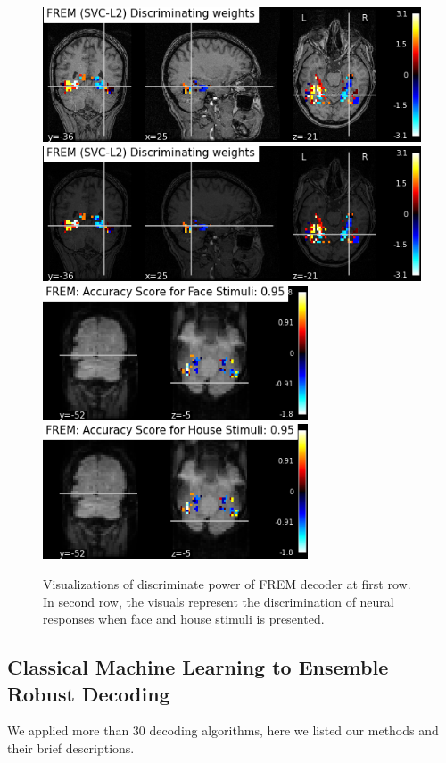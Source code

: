 \documentclass[10pt, twocolumn, letterpaper]{article}
\begin{document}
\begin{figure}
     \includegraphics[width=.5\linewidth, height=4cm,  valign=c]{images/FREM (SVC-L2) Discriminating weights anat.png}
    \includegraphics[width=.5\linewidth, height=4cm,  valign=c]{images/FREM (SVC-L2) Discriminating weights.png}
    \\[\smallskipamount]
    \includegraphics[width=.5\linewidth, height=4cm,  valign=c]{images/FREM_face.png}
    \includegraphics[width=.5\linewidth, height=4cm,  valign=c]{images/FREM_house.png}
    \caption{Visualizations of discriminate power of FREM decoder at first row. In second row, the visuals represent the discrimination of neural responses when face and house stimuli is presented.}\label{fig:frem}
\end{figure}


\subsection{Classical Machine Learning to Ensemble Robust Decoding}
We applied more than 30 decoding algorithms, here we listed our methods and their brief descriptions.
\end{document}
